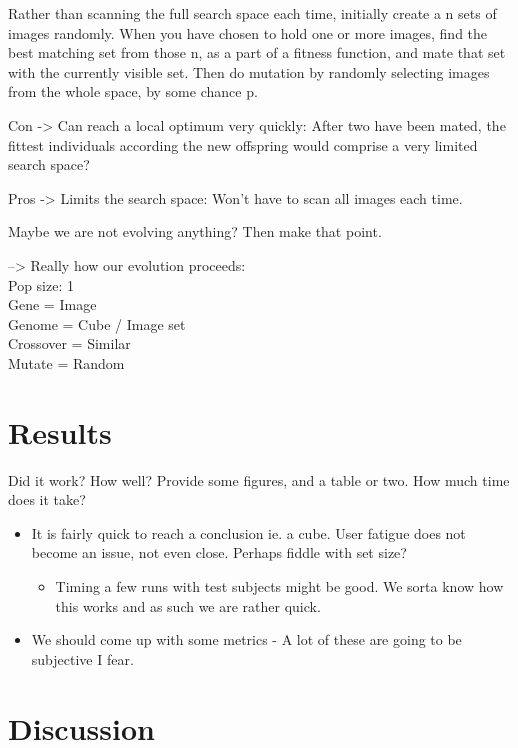 \documentclass[]{article}
\begin{document}
Rather than scanning the full search space each time, initially create a n sets of images randomly.  When you have chosen to hold one or more images, find the best matching set from those n, as a part of a fitness function, and mate that set with the currently visible set.  Then do mutation by randomly selecting images from the whole space, by some chance p.


Con ->  Can reach a local optimum very quickly:  After two have been mated, the fittest individuals according the new offspring would comprise a very limited search space?

Pros ->  Limits the search space:  Won’t have to scan all images each time.

Maybe we are not evolving anything?  Then make that point.

--> Really how our evolution proceeds:\\
Pop size: 1\\
Gene = Image\\
Genome = Cube / Image set\\
Crossover = Similar\\
Mutate = Random

\section{Results}
\label{sec:Results}
\begin{framed}
Did it work? How well? Provide some figures, and a table or two. How much time does it take?
\end{framed}
\begin{itemize}
\item It is fairly quick to reach a conclusion ie. a cube. User fatigue does not become an issue, not even close. Perhaps fiddle with set size?
	\begin{itemize}
	\item Timing a few runs with test subjects might be good. We sorta know how this works and as such we are rather quick.
	\end{itemize}
\item We should come up with some metrics - A lot of these are going to be subjective I fear.
\end{itemize}



\section{Discussion}
\label{sec:Discussion}
\end{document}

